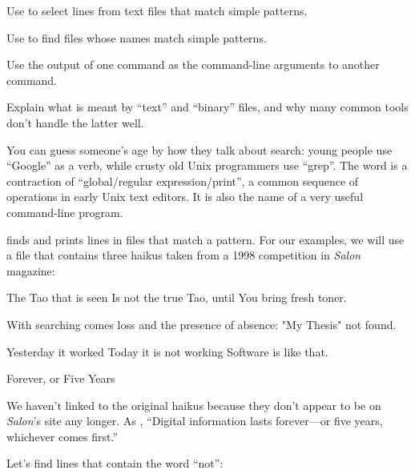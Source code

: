 \begin{objectives}
\begin{swcitemize}
\item
  Use  to select lines from text files that match simple
  patterns.
\item
  Use  to find files whose names match simple patterns.
\item
  Use the output of one command as the command-line arguments to
  another command.
\item
  Explain what is meant by ``text'' and ``binary'' files, and why many
  common tools don't handle the latter well.
\end{swcitemize}
\end{objectives}

You can guess someone's age by how they talk about search: young people
use ``Google'' as a verb, while crusty old Unix programmers use
``grep''. The word is a contraction of ``global/regular
expression/print'', a common sequence of operations in early Unix text
editors. It is also the name of a very useful command-line program.

 finds and prints lines in files that match a pattern. For
our examples, we will use a file that contains three haikus taken from a
1998 competition in \emph{Salon} magazine:


\begin{VerbOut}
The Tao that is seen
Is not the true Tao, until
You bring fresh toner.

With searching comes loss
and the presence of absence:
"My Thesis" not found.

Yesterday it worked
Today it is not working
Software is like that.
\end{VerbOut}

\begin{swcbox}{Forever, or Five Years}

We haven't linked to the original haikus because they don't appear to be
on \emph{Salon}'s site any longer. As
, ``Digital information lasts forever---or five years, whichever
comes first.''

\end{swcbox}

Let's find lines that contain the word ``not'':


